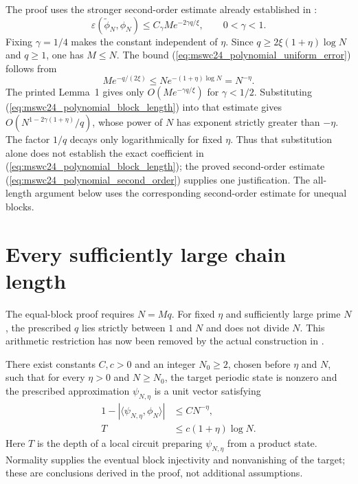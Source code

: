 \documentclass{article}
\begin{document}
The proof uses the stronger second-order estimate already established in
:
\begin{equation}
    \varepsilon(\widetilde\phi_N,\phi_N)
    \leq C_\gamma M e^{-2\gamma q/\xi},\qquad 0<\gamma<1.
    \label{eq:mswc24_polynomial_second_order}
\end{equation}
Fixing $\gamma=1/4$ makes the constant independent of $\eta$. Since
$q\geq2\xi(1+\eta)\log N$ and $q\geq1$, one has $M\leq N$. The bound
(\ref{eq:mswc24_polynomial_uniform_error}) follows from
\begin{equation*}
    M e^{-q/(2\xi)}
    \leq N e^{-(1+\eta)\log N}=N^{-\eta}.
\end{equation*}
The printed Lemma~1 gives only $O(Me^{-\gamma q/\xi})$ for
$\gamma<1/2$. Substituting (\ref{eq:mswc24_polynomial_block_length}) into
that estimate gives $O(N^{1-2\gamma(1+\eta)}/q)$, whose power of $N$
has exponent strictly greater than $-\eta$. The factor $1/q$ decays only
logarithmically for fixed $\eta$. Thus that substitution alone does not
establish the exact coefficient in
(\ref{eq:mswc24_polynomial_block_length}); the proved second-order
estimate (\ref{eq:mswc24_polynomial_second_order}) supplies one justification.
The all-length argument below uses the corresponding second-order
estimate for unequal blocks.

\section{Every sufficiently large chain length}
The equal-block proof requires $N=Mq$. For fixed $\eta$ and sufficiently
large prime $N$, the prescribed $q$ lies strictly between $1$ and $N$
and does not divide $N$. This arithmetic restriction has now been removed
by the actual construction in
.

There exist constants $C,c>0$ and an integer $N_0\geq2$, chosen before
$\eta$ and $N$, such that for every $\eta>0$ and $N\geq N_0$, the target
periodic state is nonzero and the prescribed approximation $\psi_{N,\eta}$
is a unit vector satisfying
\begin{align}
    1-|\langle\psi_{N,\eta},\phi_N\rangle|
      &\leq C N^{-\eta},\label{eq:mswc24_polynomial_all_length_error}\\
    T &\leq c(1+\eta)\log N.
    \label{eq:mswc24_polynomial_all_length_depth}
\end{align}
Here $T$ is the depth of a local circuit preparing $\psi_{N,\eta}$ from
a product state. Normality supplies the eventual block injectivity and
nonvanishing of the target; these are conclusions derived in the proof,
not additional assumptions.
\end{document}
